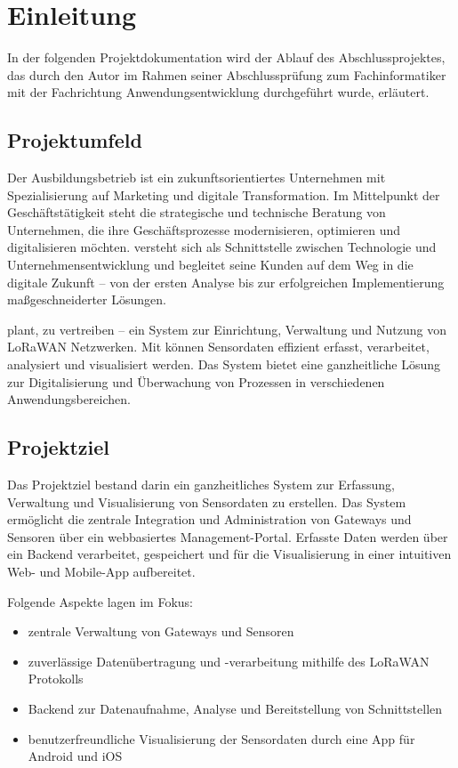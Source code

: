 \section{Einleitung}
\label{sec:Einleitung}


In der folgenden Projektdokumentation wird der Ablauf des Abschlussprojektes, das durch den Autor
im Rahmen seiner Abschlussprüfung zum Fachinformatiker mit der Fachrichtung Anwendungsentwicklung durchgeführt wurde, erläutert.


\subsection{Projektumfeld} 
\label{sec:Projektumfeld}
	Der Ausbildungsbetrieb \OFF ist ein zukunftsorientiertes Unternehmen mit Spezialisierung auf Marketing und digitale Transformation.
	Im Mittelpunkt der Geschäftstätigkeit steht die strategische und technische Beratung von Unternehmen,
	die ihre Geschäftsprozesse modernisieren, optimieren und digitalisieren möchten.
	\OFF versteht sich als Schnittstelle zwischen Technologie und Unternehmensentwicklung und begleitet seine Kunden
	auf dem Weg in die digitale Zukunft – von der ersten Analyse bis zur erfolgreichen Implementierung maßgeschneiderter Lösungen.
	
	\OFF plant, \SCO zu vertreiben – ein System zur Einrichtung, Verwaltung und Nutzung von \ac{LoRaWAN} Netzwerken.
	Mit \SCO können Sensordaten effizient erfasst, verarbeitet, analysiert und visualisiert werden.
	Das System bietet eine ganzheitliche Lösung zur Digitalisierung und Überwachung von Prozessen in verschiedenen Anwendungsbereichen.


\subsection{Projektziel} 
\label{sec:Projektziel}
	Das Projektziel bestand darin ein ganzheitliches System zur Erfassung, Verwaltung und Visualisierung von Sensordaten zu erstellen.
	Das System ermöglicht die zentrale Integration und Administration von Gateways und Sensoren über ein webbasiertes Management-Portal.
	Erfasste Daten werden über ein Backend verarbeitet, gespeichert und für die Visualisierung in einer intuitiven Web- und Mobile-App aufbereitet.
	
	Folgende Aspekte lagen im Fokus:
	\begin{itemize}
		\item zentrale Verwaltung von Gateways und Sensoren
		\item zuverlässige Datenübertragung und -verarbeitung mithilfe des \ac{LoRaWAN} Protokolls
		\item Backend zur Datenaufnahme, Analyse und Bereitstellung von Schnittstellen
		\item benutzerfreundliche Visualisierung der Sensordaten durch eine App für Android und iOS
	\end{itemize}
	
